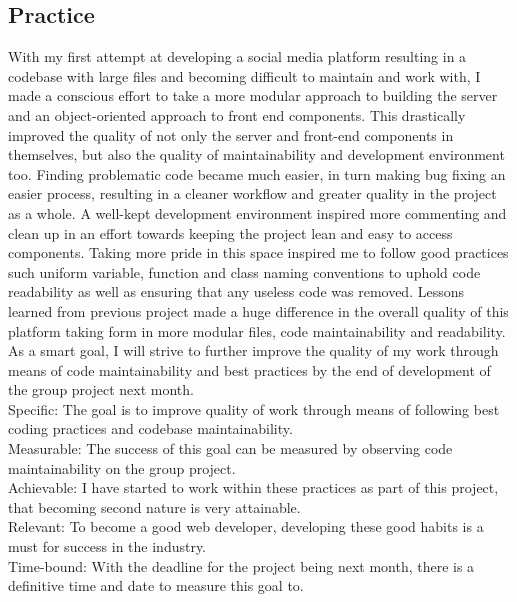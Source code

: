 \documentclass[lettersize,journal]{IEEEtran}
\begin{document}
\subsection{Practice}
With my first attempt at developing a social media platform resulting in a codebase with large files and becoming difficult to maintain and work with, I made a conscious effort to take a more modular 
approach to building the server and an object-oriented approach to front end components. This drastically improved the quality of not only the server and front-end components in themselves, but also 
the quality of maintainability and development environment too. Finding problematic code became much easier, in turn making bug fixing an easier process, resulting in a cleaner workflow and greater 
quality in the project as a whole. A well-kept development environment inspired more commenting and clean up in an effort towards keeping the project lean and easy to access components. Taking more 
pride in this space inspired me to follow good practices such uniform variable, function and class naming conventions to uphold code readability as well as ensuring that any useless code was removed.
Lessons learned from previous project made a huge difference in the overall quality of this platform taking form in more modular files, code maintainability and readability.
\\As a smart goal, I will strive to further improve the quality of my work through means of code maintainability and best practices by the end of development of the group project next month.
\\Specific: The goal is to improve quality of work through means of following best coding practices and codebase maintainability.
\\Measurable: The success of this goal can be measured by observing code maintainability on the group project.
\\Achievable: I have started to work within these practices as part of this project, that becoming second nature is very attainable.
\\Relevant: To become a good web developer, developing these good habits is a must for success in the industry.
\\Time-bound: With the deadline for the project being next month, there is a definitive time and date to measure this goal to.
\end{document}
